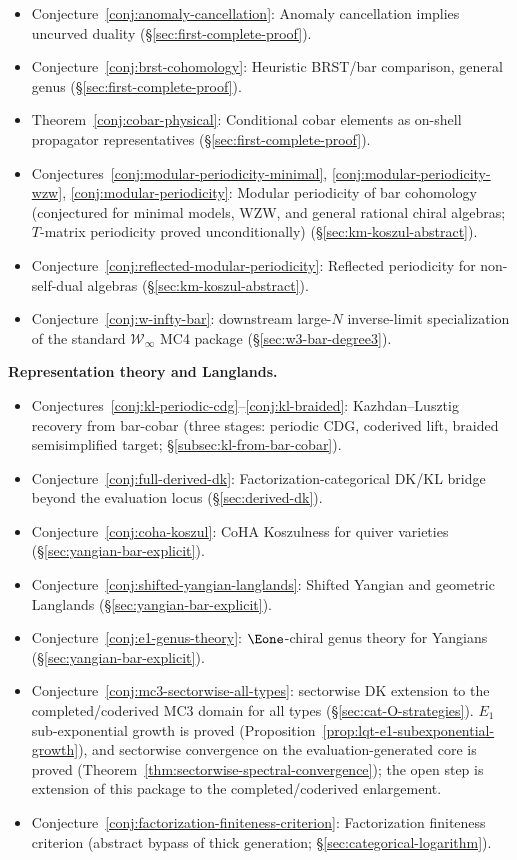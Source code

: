 \begin{itemize}[nosep]
\item Conjecture~\ref{conj:anomaly-cancellation}:
 Anomaly cancellation implies uncurved duality
 (\S\ref{sec:first-complete-proof}).
\item Conjecture~\ref{conj:brst-cohomology}:
 Heuristic BRST/bar comparison, general genus
 (\S\ref{sec:first-complete-proof}).
\item Theorem~\ref{conj:cobar-physical}:
 Conditional cobar elements as on-shell propagator representatives
 (\S\ref{sec:first-complete-proof}).
\item Conjectures~\ref{conj:modular-periodicity-minimal},
 \ref{conj:modular-periodicity-wzw},
 \ref{conj:modular-periodicity}:
 Modular periodicity of bar cohomology (conjectured for
 minimal models, WZW, and general rational chiral algebras;
 $T$-matrix periodicity proved unconditionally)
 (\S\ref{sec:km-koszul-abstract}).
\item Conjecture~\ref{conj:reflected-modular-periodicity}:
 Reflected periodicity for non-self-dual algebras
 (\S\ref{sec:km-koszul-abstract}).
\item Conjecture~\ref{conj:w-infty-bar}:
 downstream large-$N$ inverse-limit specialization of the standard
 $\mathcal{W}_\infty$ MC4 package
 (\S\ref{sec:w3-bar-degree3}).
\end{itemize}

\smallskip
\noindent\textbf{Representation theory and Langlands.}

\begin{itemize}[nosep]
\item Conjectures~\ref{conj:kl-periodic-cdg}--\ref{conj:kl-braided}:
 Kazhdan--Lusztig recovery from bar-cobar (three stages:
 periodic CDG, coderived lift, braided semisimplified target;
 \S\ref{subsec:kl-from-bar-cobar}).
\item Conjecture~\ref{conj:full-derived-dk}:
 Factorization-categorical DK/KL bridge beyond the evaluation locus
 (\S\ref{sec:derived-dk}).
\item Conjecture~\ref{conj:coha-koszul}:
 CoHA Koszulness for quiver varieties
 (\S\ref{sec:yangian-bar-explicit}).
\item Conjecture~\ref{conj:shifted-yangian-langlands}:
 Shifted Yangian and geometric Langlands
 (\S\ref{sec:yangian-bar-explicit}).
\item Conjecture~\ref{conj:e1-genus-theory}:
 $\Eone$-chiral genus theory for Yangians
 (\S\ref{sec:yangian-bar-explicit}).
\item Conjecture~\ref{conj:mc3-sectorwise-all-types}:
 sectorwise DK extension to the completed/coderived MC3 domain for
 all types
 (\S\ref{sec:cat-O-strategies}). $E_1$ sub-exponential growth is
 proved
 (Proposition~\ref{prop:lqt-e1-subexponential-growth}), and
 sectorwise convergence on the evaluation-generated core is proved
 (Theorem~\ref{thm:sectorwise-spectral-convergence}); the open step
 is extension of this package to the completed/coderived
 enlargement.
\item Conjecture~\ref{conj:factorization-finiteness-criterion}:
 Factorization finiteness criterion (abstract bypass of thick
 generation; \S\ref{sec:categorical-logarithm}).
\end{itemize}

